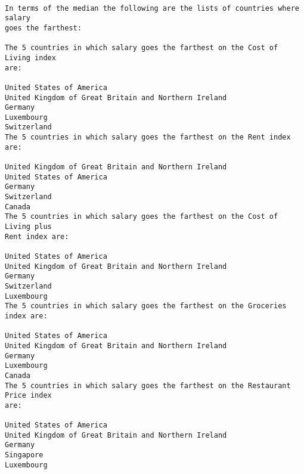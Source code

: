 \documentclass[11pt]{article}
\begin{document}
    \begin{center}
    \end{center}
    { \hspace*{\fill} \\}
    
    \begin{Verbatim}[commandchars=\\\{\}]
In terms of the median the following are the lists of countries where salary
goes the farthest:

The 5 countries in which salary goes the farthest on the Cost of Living index
are:

United States of America
United Kingdom of Great Britain and Northern Ireland
Germany
Luxembourg
Switzerland
The 5 countries in which salary goes the farthest on the Rent index are:

United Kingdom of Great Britain and Northern Ireland
United States of America
Germany
Switzerland
Canada
The 5 countries in which salary goes the farthest on the Cost of Living plus
Rent index are:

United States of America
United Kingdom of Great Britain and Northern Ireland
Germany
Switzerland
Luxembourg
The 5 countries in which salary goes the farthest on the Groceries index are:

United States of America
United Kingdom of Great Britain and Northern Ireland
Germany
Luxembourg
Canada
The 5 countries in which salary goes the farthest on the Restaurant Price index
are:

United States of America
United Kingdom of Great Britain and Northern Ireland
Germany
Singapore
Luxembourg
    \end{Verbatim}
\end{document}
